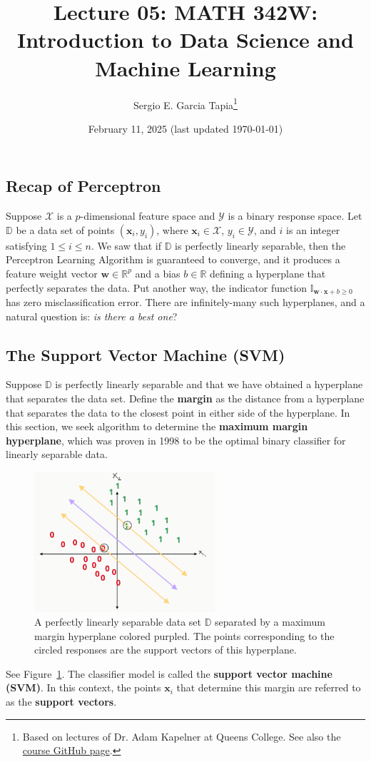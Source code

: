 \documentclass[12pt, a4paper]{article}
\title{Lecture 05: MATH 342W: Introduction to Data Science and Machine Learning}
\author{Sergio E. Garcia Tapia\thanks{Based on lectures of Dr. Adam Kapelner at Queens College.
		See also the \href{https://github.com/kapelner/QC_MATH_342W_Spring_2025}{course GitHub page}.}}
\date{February 11, 2025 (last updated \today)}
\theoremstyle{definition}
\begin{document}
	\maketitle
	
	\subsection*{Recap of Perceptron}
	Suppose $\mathcal{X}$ is a $p$-dimensional feature space and $\mathcal{Y}$ is a
	binary response space. Let $\mathbb{D}$ be a data set of points $(\mathbf{x}_i, y_i)$,
	where $\mathbf{x}_i\in \mathcal{X}$, $y_i\in \mathcal{Y}$, and $i$ is an integer
	satisfying $1\leq i\leq n$. We saw that if $\mathbb{D}$ is perfectly linearly
	separable, then the Perceptron Learning Algorithm is guaranteed to converge,
	and it produces a feature weight vector $\mathbf{w}\in\mathbb{R}^p$ and a bias
	$b\in\mathbb{R}$ defining a hyperplane that perfectly separates the data.
	Put another way, the indicator function $\mathbb{I}_{\mathbf{w}\cdot \mathbf{x}+b\geq 0}$
	has zero misclassification error.
	There are infinitely-many such hyperplanes, and a natural question is: \emph{is there a best one}?
	
	\subsection*{The Support Vector Machine (SVM)}
	Suppose $\mathbb{D}$ is perfectly linearly separable and that we have obtained a hyperplane
	that separates the data set.
	Define the \textbf{margin} as the distance from a hyperplane that separates the data to the closest point
	in either side of the hyperplane. In this section, we seek algorithm to determine
	the \textbf{maximum margin hyperplane}, which was proven in 1998 to be the optimal
	binary classifier for linearly separable data.
	
	\begin{figure}[h]
		\centering
		\includegraphics[width=0.6\textwidth]{max-margin-hyperplane}
		\caption{A perfectly linearly separable data set $\mathbb{D}$ separated by
		a maximum margin hyperplane colored purpled. The points corresponding to the circled responses
		are the support vectors of this hyperplane.}
		\label{fig:max-margin-hyperplane}
	\end{figure}
	See Figure~\ref{fig:max-margin-hyperplane}.
	The classifier model is called the \textbf{support vector machine (SVM)}. In this context,
	the points $\mathbf{x}_i$ that determine this margin are referred to as the \textbf{support vectors}.
	
\end{document}
